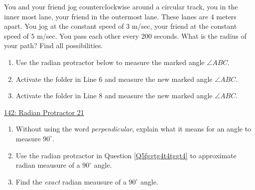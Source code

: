 \documentclass{ximera}
\begin{document}
\begin{question} \label{QOIDftrerggedsf3}
You and your friend jog counterclockwise around a circular track, you in the inner most lane, your friend in the outermost lane. These lanes are $4$ meters apart. You jog at the constant speed of $3$ m/sec, your friend at the constant speed of $5$ m/sec.
You pass each other every 200 seconds. What is the radius of your path? Find all possibilities.

\end{question}





\begin{question} \label{Q5fggtg4t4tggt4}
\begin{enumerate}
\item Use the radian protractor below to measure the marked angle $\angle ABC$.

\item Activate the folder in Line 6 and measure the new marked angle $\angle ABC$.

\item Activate the folder in Line 8 and measure the new marked angle $\angle ABC$.

\end{enumerate}

\begin{onlineOnly}
    \begin{center}
\end{center}
\end{onlineOnly}



\href{https://www.desmos.com/calculator/dqedbpsohm}{142: Radian Protractor 21}
\end{question}



\begin{question} \label{Q435g5yyhhhht}
\begin{enumerate}
\item Without using the word \emph{perpendicular}, explain what it means for an angle to measure $90^\circ$.

\item Use the radian protractor in Question \ref{Q5fggtg4t4tggt4} to approximate radian meausure of a $90^\circ$ angle.

\item Find the \emph{exact} radian meausure of a $90^\circ$ angle.
\end{enumerate}
\end{question}
\end{document}
